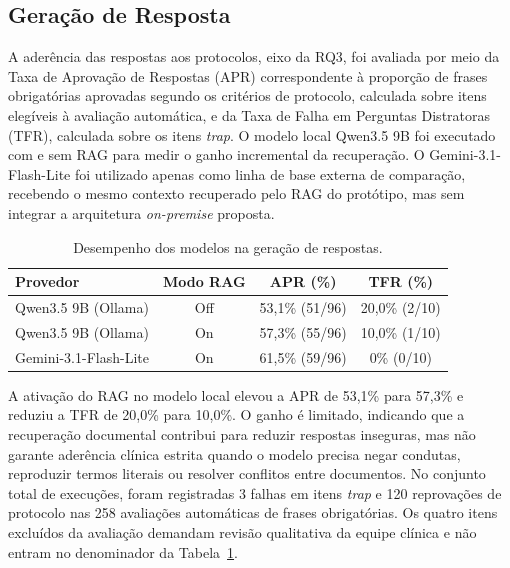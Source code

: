 
\subsection{Geração de Resposta}

A aderência das respostas aos protocolos, eixo da RQ3, foi avaliada por meio da Taxa de Aprovação de Respostas (APR) correspondente à proporção de frases obrigatórias aprovadas segundo os critérios de protocolo, calculada sobre itens elegíveis à avaliação automática, e da Taxa de Falha em Perguntas Distratoras (TFR), calculada sobre os itens \textit{trap}.
O modelo local Qwen3.5 9B foi executado com e sem RAG para medir o ganho incremental da recuperação.
O Gemini-3.1-Flash-Lite foi utilizado apenas como linha de base externa de comparação, recebendo o mesmo contexto recuperado pelo RAG do protótipo, mas sem integrar a arquitetura \textit{on-premise} proposta.

\begin{table}[h!]
  \centering
  \caption{Desempenho dos modelos na geração de respostas.}
  \label{tab:apr_tfr_providers}
  \small
  \begin{tabular}{lccc}
  	\toprule
  	\textbf{Provedor}           & \textbf{Modo RAG} & \textbf{APR (\%)} & \textbf{TFR (\%)} \\
  	\midrule
  	Qwen3.5 9B (Ollama)         & Off               & 53,1\% (51/96)    & 20,0\% (2/10)     \\
	  Qwen3.5 9B (Ollama)         & On                & 57,3\% (55/96)    & 10,0\% (1/10)     \\
  	Gemini-3.1-Flash-Lite       & On                & 61,5\% (59/96)    & 0\% (0/10)      \\
  	\bottomrule
  \end{tabular}
  \end{table}

A ativação do RAG no modelo local elevou a APR de 53,1\% para 57,3\% e reduziu a TFR de 20,0\% para 10,0\%.
O ganho é limitado, indicando que a recuperação documental contribui para reduzir respostas inseguras, mas não garante aderência clínica estrita quando o modelo precisa negar condutas, reproduzir termos literais ou resolver conflitos entre documentos.
No conjunto total de execuções, foram registradas 3 falhas em itens \textit{trap} e 120 reprovações de protocolo nas 258 avaliações automáticas de frases obrigatórias.
Os quatro itens excluídos da avaliação demandam revisão qualitativa da equipe clínica e não entram no denominador da Tabela~\ref{tab:apr_tfr_providers}.

